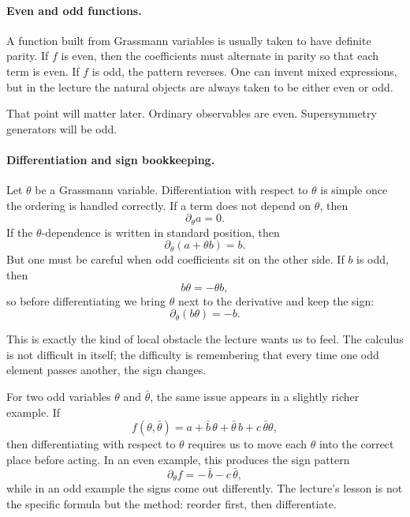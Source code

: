 \paragraph{Even and odd functions.}
A function built from Grassmann variables is usually taken to have definite parity. If \(f\) is even, then the coefficients must alternate in parity so that each term is even. If \(f\) is odd, the pattern reverses. One can invent mixed expressions, but in the lecture the natural objects are always taken to be either even or odd.

That point will matter later. Ordinary observables are even. Supersymmetry generators will be odd.

\paragraph{Differentiation and sign bookkeeping.}
Let \(\theta\) be a Grassmann variable. Differentiation with respect to \(\theta\) is simple once the ordering is handled correctly. If a term does not depend on \(\theta\), then
\begin{equation}
\partial_\theta a=0.
\end{equation}
If the \(\theta\)-dependence is written in standard position, then
\begin{equation}
\partial_\theta(a+\theta b)=b.
\end{equation}
But one must be careful when odd coefficients sit on the other side. If \(b\) is odd, then
\begin{equation}
b\theta=-\theta b,
\end{equation}
so before differentiating we bring \(\theta\) next to the derivative and keep the sign:
\begin{equation}
\partial_\theta(b\theta)=-b.
\end{equation}

This is exactly the kind of local obstacle the lecture wants us to feel. The calculus is not difficult in itself; the difficulty is remembering that every time one odd element passes another, the sign changes.

For two odd variables \(\theta\) and \(\bar\theta\), the same issue appears in a slightly richer example. If
\begin{equation}
f(\theta,\bar\theta)=a+\bar b\,\theta+\bar\theta\,b+c\,\bar\theta\theta,
\end{equation}
then differentiating with respect to \(\theta\) requires us to move each \(\theta\) into the correct place before acting. In an even example, this produces the sign pattern
\begin{equation}
\partial_\theta f=-\,\bar b-c\,\bar\theta,
\end{equation}
while in an odd example the signs come out differently. The lecture's lesson is not the specific formula but the method: reorder first, then differentiate.


